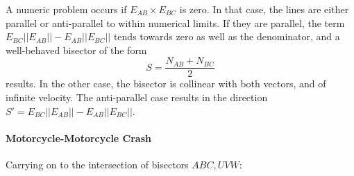\documentclass[12pt,a4paper,oneside,openany]{article}
\begin{document}
A numeric problem occurs if $E_{AB} \times E_{BC}$ is zero. In that case, the lines are either parallel or anti-parallel to within numerical limits. If they are parallel, the term $E_{BC}|| E_{AB} || - E_{AB} || E_{BC} ||$ tends towards zero as well as the denominator, and a well-behaved bisector of the form
$$ S = \frac{N_{AB} + N_{BC}}{2}$$
results. In the other case, the bisector is collinear with both vectors, and of infinite velocity. The anti-parallel case results in the direction $ S' = E_{BC}|| E_{AB} || - E_{AB} || E_{BC} ||.$

\paragraph{Motorcycle-Motorcycle Crash}

Carrying on to the intersection of bisectors $ABC, UVW$:
\end{document}
